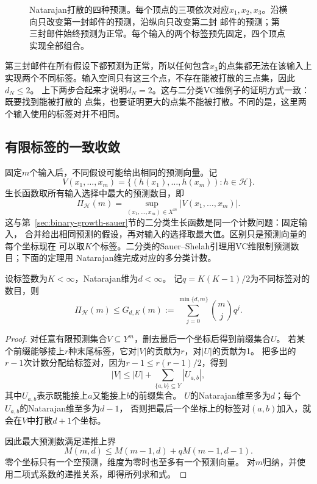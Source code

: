 \begin{figure}[htbp]
 \centering
 
 \caption{Natarajan打散的四种预测。每个顶点的三项依次对应$x_1,x_2,x_3$。沿横向只改变第一封邮件的预测，沿纵向只改变第二封
 邮件的预测；第三封邮件始终预测为正常。每个输入的两个标签预先固定，四个顶点实现全部组合。}
 \label{fig:natarajan-concrete}
\end{figure}
\FloatBarrier

第三封邮件在所有假设下都预测为正常，所以任何包含$x_3$的点集都无法在该输入上
实现两个不同标签。输入空间只有这三个点，不存在能被打散的三点集，因此$d_N\leq2$。
上下两步合起来才说明$d_N=2$。这与二分类VC维例子的证明方式一致：既要找到能被打散的
点集，也要证明更大的点集不能被打散。不同的是，这里两个输入使用的标签对并不相同。

\subsection{有限标签的一致收敛}

固定$m$个输入后，不同假设可能给出相同的预测向量。记
\[
 V(x_1,\ldots,x_m)
 =\{(h(x_1),\ldots,h(x_m)):h\in\mathcal H\}.
\]
生长函数取所有输入选择中最大的预测数目，即
\[
 \Pi_{\mathcal H}(m)=\sup_{(x_1,\ldots,x_m)\in X^m}|V(x_1,\ldots,x_m)|.
\]
这与第~\ref{sec:binary-growth-sauer}节的二分类生长函数是同一个计数问题：固定输入，
合并给出相同预测的假设，再对输入的选择取最大值。区别只是预测向量的每个坐标现在
可以取$K$个标签。二分类的Sauer--Shelah引理用VC维限制预测数目；下面的定理用
Natarajan维完成对应的多分类计数。

\begin{theorem}[有限标签的预测数目上界]
\label{thm:multiclass-growth-bound}
设标签数为$K<\infty$，Natarajan维为$d<\infty$。
记$q=K(K-1)/2$为不同标签对的数目，则
\[
 \Pi_{\mathcal H}(m)\leq G_{d,K}(m)
 :=\sum_{j=0}^{\min\{d,m\}}\binom mj q^j.
\]
\end{theorem}

\begin{proof}
对任意有限预测集合$V\subseteq Y^m$，删去最后一个坐标后得到前缀集合$U$。
若某个前缀能够接上$r$种末尾标签，它对$|V|$的贡献为$r$，对$|U|$的贡献为1。
把多出的$r-1$次计数分配给标签对，因为$r-1\leq r(r-1)/2$，得到
\[
 |V|\leq|U|+\sum_{\{a,b\}\subseteq Y}|U_{a,b}|,
\]
其中$U_{a,b}$表示既能接上$a$又能接上$b$的前缀集合。
$U$的Natarajan维至多为$d$；每个$U_{a,b}$的Natarajan维至多为$d-1$，
否则把最后一个坐标上的标签对$(a,b)$加入，就会在$V$中打散$d+1$个坐标。

因此最大预测数满足递推上界
\[
 M(m,d)\leq M(m-1,d)+qM(m-1,d-1).
\]
零个坐标只有一个空预测，维度为零时也至多有一个预测向量。
对$m$归纳，并使用二项式系数的递推关系，即得所列求和式。
\end{proof}

